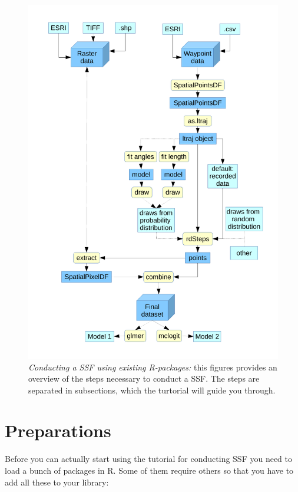 \documentclass[11pt, a4paper]{article}\usepackage[]{graphicx}\usepackage[]{color}
\begin{document}
\begin{figure} %
\captionsetup{width=1\textwidth}
\centering
\includegraphics[width=1\textwidth]{Flowchart.pdf} %
\caption{\emph{Conducting a SSF using existing R-packages:} this figures provides an overview of the steps necessary to conduct a SSF. The steps are separated in subsections, which the turtorial will guide you through.}
\label{fig:Flowchart}
\end{figure}




\section{Preparations}
Before you can actually start using the tutorial for conducting SSF you need to load a bunch of packages in R. Some of them require others so that you have to add all these to your library:
\end{document}
